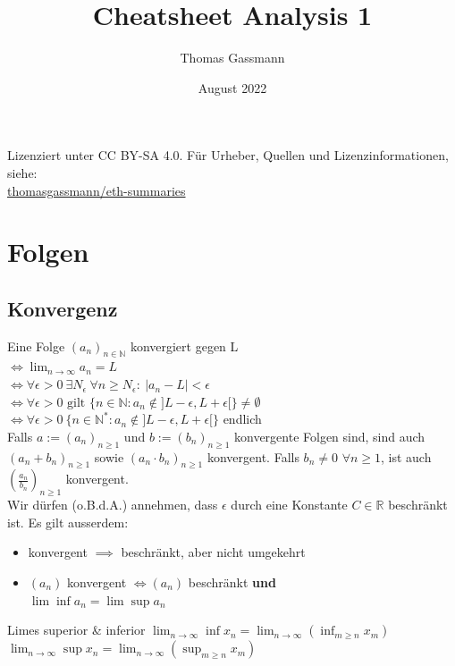 \documentclass[a4paper,10pt]{article}
\title{Cheatsheet Analysis 1}
\author{Thomas Gassmann}
\date{August 2022}
\def\limn{\lim_{n\to \infty}}
\def\R{\mathbb{R}}
\begin{document}
\begin{center}
  Lizenziert unter CC BY-SA 4.0. Für Urheber, Quellen und Lizenzinformationen, siehe:\\
  \href{https://github.com/thomasgassmann/eth-summaries}{thomasgassmann/eth-summaries}
\end{center}

\section{Folgen}
\subsection{Konvergenz}
Eine Folge $(a_n)_{n\in \mathbb{N}}$ konvergiert gegen L \\
 $\iff \lim_{n \to \infty} a_n = L$ \\ 
 $\iff \forall \epsilon > 0 \ \exists N_\epsilon \ \forall n \ge N_\epsilon : \ | a_n - L | < \epsilon$\\
 $\iff \forall \epsilon > 0\text{ gilt }\{ n\in\mathbb{N}:a_n\notin ]L-\epsilon,L+\epsilon[ \} \neq \emptyset $\\
 $\iff \forall \epsilon > 0 \ \{ n \in \mathbb{N}^* : a_n \notin ]L - \epsilon, L + \epsilon[ \}$ endlich\\

Falls $a := (a_n)_{n \geq 1}$ und $b := (b_n)_{n \geq 1}$ konvergente Folgen sind, sind auch $(a_n + b_n)_{n \geq 1}$ sowie $(a_n \cdot b_n)_{n \geq 1}$ konvergent. Falls $b_n \neq 0$ $\forall n \geq 1$, ist auch $(\frac{a_n}{b_n})_{n \geq 1}$ konvergent.\\

Wir dürfen (o.B.d.A.) annehmen, dass $\epsilon$ durch eine Konstante $C \in \R$ beschränkt ist.
Es gilt ausserdem:
\begin{itemize}
 \item konvergent $\implies$ beschränkt, aber nicht umgekehrt
 \item $(a_n)$ konvergent $\iff (a_n)$ beschränkt \textbf{und} \\$\lim \inf a_n = \lim \sup a_n$
\end{itemize}


\begin{subbox}{Limes superior \& inferior}
$\limn \inf x_n = \limn \left( \inf_{m \ge n} x_m \right)$ \\
$\limn \sup x_n = \limn \left( \sup_{m \ge n} x_m \right)$
\end{subbox}
\end{document}
